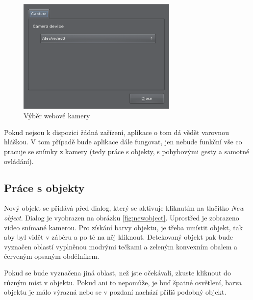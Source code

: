 \begin{figure}[h]
\centering
\includegraphics[width=0.7\textwidth]{settings.png}
\caption{Výběr webové kamery}
\label{fig:settings}
\end{figure}

Pokud nejsou k dispozici žádná zařízení, aplikace o tom dá vědět varovnou
hláškou. V tom případě bude aplikace dále fungovat, jen nebude funkční vše co
pracuje se snímky z kamery (tedy práce s objekty, s pohybovými gesty a samotné
ovládání).

\subsection{Práce s objekty}
Nový objekt se přidává před dialog, který se aktivuje kliknutím na tlačítko
\emph{New object}. Dialog je vyobrazen na obrázku \ref{fig:newobject}. Uprostřed je zobrazeno
video snímané kamerou. Pro získání barvy objektu, je třeba umístit objekt, tak
aby byl vidět v záběru a po té na něj kliknout. Detekovaný objekt pak bude
vyznačen oblastí vyplněnou modrými tečkami a zeleným konvexním obalem a
červeným opsaným obdélníkem.

Pokud se bude vyznačena jiná oblast, než jste očekávali, zkuste kliknout do
různým míst v objektu. Pokud ani to nepomůže, je buď špatné osvětlení, barva
objektu je málo výrazná nebo se v pozdaní nachází příliš podobný objekt.

